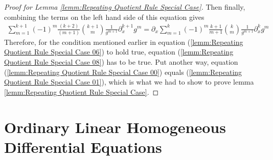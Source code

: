 \begin{proof}[Proof for Lemma \ref{lemm:Repeating Quotient Rule Special Case}]
Then finally, combining the terms on the left hand side of this equation gives
\begin{align}
\sum_{m=1}^{k+1}(-1)^m\frac{(k+2)}{(m+1)}\binom{k+1}{m}\frac{1}{g^{m+1}}\partial_x^{k+1}g^m  = \partial_x\sum_{m=1}^{k}(-1)^m\frac{k+1}{m+1}\binom{k}{m}\frac{1}{g^{m+1}}\partial_x^{k}g^m \label{lemm:Repeating Quotient Rule Special Case 08}
\end{align}
Therefore, for the condition mentioned earlier in equation (\ref{lemm:Repeating Quotient Rule Special Case 06}) to hold true, equation (\ref{lemm:Repeating Quotient Rule Special Case 08}) has to be true. Put another way, equation (\ref{lemm:Repeating Quotient Rule Special Case 00}) equals (\ref{lemm:Repeating Quotient Rule Special Case 01}), which is what we had to show to prove lemma \ref{lemm:Repeating Quotient Rule Special Case}.

\end{proof}
	













































\section{Ordinary Linear Homogeneous Differential Equations}

